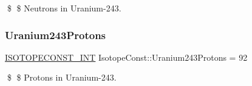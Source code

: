 \$ \$ Neutrons in Uranium-\/243. \mbox{\label{group___isotope_const-_uranium-_u243_ga9ee509c3e287720cebdc008455487138}} 
\subsubsection{\texorpdfstring{Uranium243\+Protons}{Uranium243Protons}}
{\footnotesize\ttfamily \mbox{\hyperlink{group___isotope_const-_macros_ga5f18360b3e99483a35c32d789e62621c}{I\+S\+O\+T\+O\+P\+E\+C\+O\+N\+S\+T\+\_\+\+I\+NT}} Isotope\+Const\+::\+Uranium243\+Protons = 92}

\$ \$ Protons in Uranium-\/243. 
